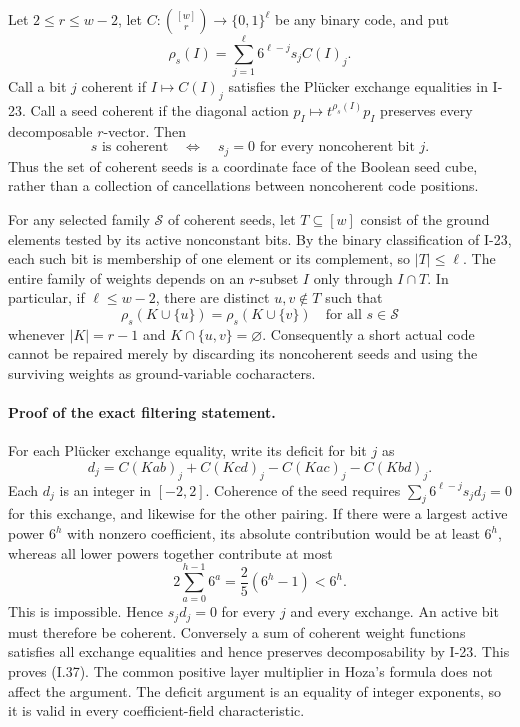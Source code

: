 Let $2\le r\le w-2$, let
$C:\binom{[w]}r\longrightarrow\{0,1\}^{\ell}$ be any binary
code, and put
\[
 \rho_s(I)=\sum_{j=1}^{\ell}6^{\ell-j}s_j C(I)_j.
 \tag{I.36}
\]
Call a bit $j$ coherent if $I\mapsto C(I)_j$ satisfies the
Pl\"ucker exchange equalities in I-23.  Call a seed coherent
if the diagonal action $p_I\mapsto t^{\rho_s(I)}p_I$
preserves every decomposable $r$-vector.
Then
\[
 s\text{ is coherent}
 \quad\Longleftrightarrow\quad
 s_j=0\text{ for every noncoherent bit }j.
 \tag{I.37}
\]
Thus the set of coherent seeds is a coordinate face of the
Boolean seed cube, rather than a collection of cancellations
between noncoherent code positions.

For any selected family $\mathcal S$ of coherent seeds, let
$T\subseteq[w]$ consist of the ground elements tested by its
active nonconstant bits.  By the binary classification of I-23,
each such bit is membership of one element or its complement,
so $|T|\le\ell$.  The entire family of weights depends on an
$r$-subset $I$ only through $I\cap T$.  In particular, if
$\ell\le w-2$, there are distinct $u,v\notin T$ such that
\[
 \rho_s(K\cup\{u\})=\rho_s(K\cup\{v\})
 \quad\text{for all }s\in\mathcal S
 \tag{I.38}
\]
whenever $|K|=r-1$ and $K\cap\{u,v\}=\varnothing$.
Consequently a short actual code cannot be repaired merely
by discarding its noncoherent seeds and using the surviving
weights as ground-variable cocharacters.

\paragraph{Proof of the exact filtering statement.}
For each Pl\"ucker exchange equality, write its deficit for
bit $j$ as
\[
 d_j=C(Kab)_j+C(Kcd)_j-C(Kac)_j-C(Kbd)_j.
\]
Each $d_j$ is an integer in $[-2,2]$.  Coherence of the seed
requires $\sum_j 6^{\ell-j}s_jd_j=0$ for this exchange,
and likewise for the other pairing.  If there were a largest
active power $6^h$ with nonzero coefficient, its absolute
contribution would be at least $6^h$, whereas all lower
powers together contribute at most
\[
 2\sum_{a=0}^{h-1}6^a
   =\frac25(6^h-1)<6^h.
\]
This is impossible.  Hence $s_jd_j=0$ for every $j$ and
every exchange.  An active bit must therefore be coherent.
Conversely a sum of coherent weight functions satisfies all
exchange equalities and hence preserves decomposability by
I-23.  This proves (I.37).  The common positive layer
multiplier in Hoza's formula does not affect the argument.
The deficit argument is an equality of integer exponents,
so it is valid in every coefficient-field characteristic.

